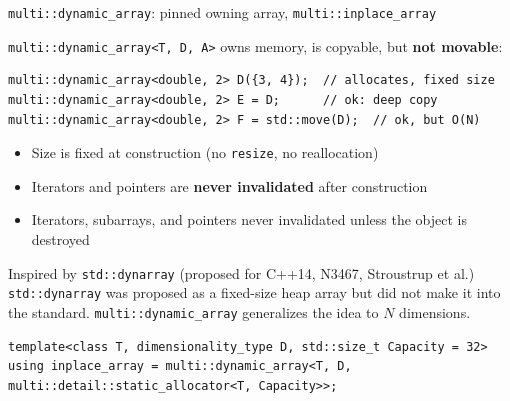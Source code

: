 \documentclass[t,aspectratio=169,handout]{beamer}
\begin{document}
\begin{frame}[fragile]{\texttt{multi::dynamic\_array}: pinned owning array, \texttt{multi::inplace\_array}}

\lstinline|multi::dynamic_array<T, D, A>| owns memory, is copyable, but \textbf{not movable}:

\begin{lstlisting}
multi::dynamic_array<double, 2> D({3, 4});  // allocates, fixed size
multi::dynamic_array<double, 2> E = D;      // ok: deep copy
multi::dynamic_array<double, 2> F = std::move(D);  // ok, but O(N)
\end{lstlisting}

\begin{itemize}
  \item Size is fixed at construction (no \lstinline|resize|, no reallocation)
  \item Iterators and pointers are \textbf{never invalidated} after construction
  \item Iterators, subarrays, and pointers never invalidated unless the object is destroyed
\end{itemize}

\begin{block}{Inspired by \texttt{std::dynarray} (proposed for C++14, N3467, Stroustrup et al.)}
  \texttt{std::dynarray} was proposed as a fixed-size heap array
  but did not make it into the standard.
  \texttt{multi::dynamic\_array} generalizes the idea to $N$ dimensions.
\end{block}

\begin{lstlisting}
template<class T, dimensionality_type D, std::size_t Capacity = 32>
using inplace_array = multi::dynamic_array<T, D, multi::detail::static_allocator<T, Capacity>>;
\end{lstlisting}

\end{frame}
\end{document}
